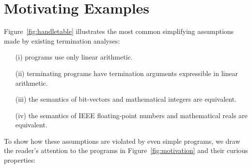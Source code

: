 \documentclass[a4paper]{llncs}
\begin{document}
\section{Motivating Examples} \label{sec:motivation}

Figure~\ref{fig:handletable} illustrates the most common simplifying
assumptions made by existing termination analyses:
%
\begin{itemize}
\item[(i)] programs use only linear arithmetic.
\item[(ii)] terminating programs have termination arguments expressible in linear arithmetic.
\item[(iii)] the semantics of bit-vectors and mathematical integers are equivalent.
\item[(iv)] the semantics of IEEE floating-point numbers and mathematical reals are equivalent.
\end{itemize}  

To show how these assumptions are violated by even simple programs, we draw
the reader's attention to the programs in Figure~\ref{fig:motivation} and
their curious properties:
\end{document}
